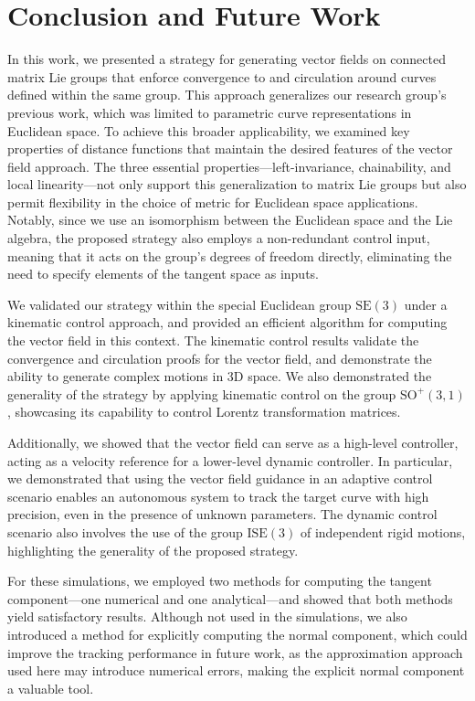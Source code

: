 \chapter{Conclusion and Future Work}\label{ch:conclusion}
In this work, we presented a strategy for generating vector fields on connected matrix Lie groups that enforce convergence to and circulation around curves defined within the same group. This approach generalizes our research group's previous work, which was limited to parametric curve representations in Euclidean space. To achieve this broader applicability, we examined key properties of distance functions that maintain the desired features of the vector field approach. The three essential properties---left-invariance, chainability, and local linearity---not only support this generalization to matrix Lie groups but also permit flexibility in the choice of metric for Euclidean space applications. Notably, since we use an isomorphism between the Euclidean space and the Lie algebra, the proposed strategy also employs a non-redundant control input, meaning that it acts on the group's degrees of freedom directly, eliminating the need to specify elements of the tangent space as inputs.

We validated our strategy within the special Euclidean group $\text{SE}(3)$ under a kinematic control approach, and provided an efficient algorithm for computing the vector field in this context. The kinematic control results validate the convergence and circulation proofs for the vector field, and demonstrate the ability to generate complex motions in 3D space. We also demonstrated the generality of the strategy by applying kinematic control on the group $\text{SO}^+(3, 1)$, showcasing  its capability to control Lorentz transformation matrices.

Additionally, we showed that the vector field can serve as a high-level controller, acting as a velocity reference for a lower-level dynamic controller. In particular, we demonstrated that using the vector field guidance in an adaptive control scenario enables an autonomous system to track the target curve with high precision, even in the presence of unknown parameters. The dynamic control scenario also involves the use of the group $\text{ISE}(3)$ of independent rigid motions, highlighting the generality of the proposed strategy.

For these simulations, we employed two methods for computing the tangent component---one numerical and one analytical---and showed that both methods yield satisfactory results. Although not used in the simulations, we also introduced a method for explicitly computing the normal component, which could improve the tracking performance in future work, as the approximation approach used here may introduce numerical errors, making the explicit normal component a valuable tool.


